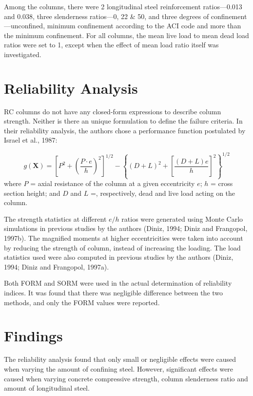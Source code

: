 \documentclass[a4paper]{article}
\begin{document}
Among the columns, there were 2 longitudinal steel reinforcement ratios---0.013
and 0.038, three slenderness ratios---0, 22 \& 50, and three degrees of 
confinement---unconfined, minimum confinement according to the ACI code and more
than the minimum confinement. For all columns, the mean live load to mean dead
load ratios were set to 1, except when the effect of mean load ratio 
itself was investigated.


\section*{Reliability Analysis}
RC columns do not have any closed-form expressions to describe column strength.
Neither is there an unique formulation to define the failure criteria. 
In their reliability analysis, the authors chose a performance function 
postulated by Israel et al., 1987:

\begin{equation}
g(\mathbf{X}) = \left[ P^2 + \left( \frac{P \cdot e}{h} \right) ^2 \right] ^{1/2} - \left\{\left(D + L\right)^2 + \left[\frac{\left(D + L\right)e}{h}\right]^2\right\}^{1/2}
\end{equation}
where $P$ = axial resistance of the column at a given eccentricity $e$; 
$h$ = cross section height; and $D$ and $L$ =, respectively, dead and live
load acting on the column.

The strength statistics at different $e/h$ ratios were generated using Monte Carlo
simulations in previous studies by the authors (Diniz, 1994; Diniz and Frangopol, 1997b).
The magnified moments at higher eccentricities were taken into account
by reducing the strength of column, instead of increasing the loading.
The load statistics used were also computed in previous studies by the authors
(Diniz, 1994; Diniz and Frangopol, 1997a).

Both FORM and SORM were used in the actual determination of reliability indices.
It was found that there was negligible difference between the two methods, and
only the FORM values were reported.

\section*{Findings}
The reliability analysis found that only small or negligible effects were caused 
when varying the amount of confining steel. However, significant effects were caused 
when varying concrete compressive strength, column slenderness ratio and 
amount of longitudinal steel.
\end{document}
